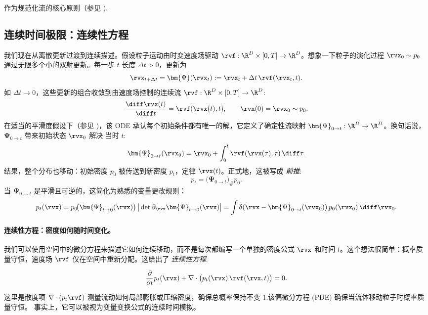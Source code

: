  作为规范化流的核心原则（参见 ).


\subsection{连续时间极限：连续性方程}\label{subsec:cov-continuity-eq}


我们现在从离散更新过渡到连续描述。假设粒子运动由时变速度场驱动
$\rvf:\R^D \times [0,T]\to \R^D$。想象一下粒子的演化过程 $\rvx_0 \sim p_0$ 通过无限多个小的双射更新。每一步 $t$ 长度 $\Delta t>0$，更新为
\[
\rvx_{t+\Delta t} = \bm{\Psi}(\rvx_t)
:= \rvx_t + \Delta t\, \rvf(\rvx_t, t).
\]
如 $\Delta t \to 0$，这些更新的组合收敛到由速度场控制的连续流 $\rvf:\R^D \times [0,T]\to \R^D$:
\begin{align}\label{eq:ode-f-continuity}
    \frac{\diff \rvx(t)}{\diff t} = \rvf(\rvx(t), t),
    \qquad \rvx(0) = \rvx_0 \sim p_0.
\end{align}
在适当的平滑度假设下（参见 )，该 ODE 承认每个初始条件都有唯一的解，它定义了确定性流映射
$\bm{\Psi}_{0\to t}:\R^D \to \R^D$。换句话说， $\bm{\Psi}_{0\to t}$ 带来初始状态 $\rvx_0$ 解决  当时 $t$:
\[
\bm{\Psi}_{0\to t}(\rvx_0)
= \rvx_0 + \int_{0}^{t} \rvf(\rvx(\tau), \tau)\,\diff\tau.
\]
结果，整个分布也移动：初始密度 $p_0$ 被传送到新密度 $p_t$，定律 $\rvx(t)$。正式地，这被写成 \emph{前推}:
\[
p_t = \big(\bm{\Psi}_{0\to t}\big)_{\#} p_0.
\]
当 $\bm{\Psi}_{0\to t}$ 是平滑且可逆的，这简化为熟悉的变量更改规则：
\[
p_t(\rvx)
= p_0\!\big(\bm{\Psi}_{t\to 0}(\rvx)\big)\,
   \big|\det \partial_\rvx\bm{\Psi}_{t\to 0}(\rvx)\big|
= \int \delta\!\left(\rvx - \bm{\Psi}_{0\to t}(\rvx_0)\right)
   p_0(\rvx_0)\,\diff\rvx_0.
\]

\paragraph{连续性方程：密度如何随时间变化。}
我们可以使用空间中的微分方程来描述它如何连续移动，而不是每次都编写一个单独的密度公式 $\rvx$ 和时间 $t$。这个想法很简单：概率质量守恒，速度场 $\rvf$ 仅在空间中重新分配。这给出了 \emph{连续性方程}:
\begin{mdframed}
\begin{align}\label{eq:continuity-cov}
    \frac{\partial}{\partial t} p_t(\rvx)
    + \nabla \cdot \big( p_t(\rvx)\,\rvf(\rvx, t) \big) = 0.
\end{align}
\end{mdframed}
这里是散度项 $\nabla \cdot (p_t \rvf)$ 测量流动如何局部膨胀或压缩密度，确保总概率保持不变 $1$.该偏微分方程 (PDE) 确保当流体移动粒子时概率质量守恒。
事实上，它可以被视为变量变换公式的连续时间模拟。


